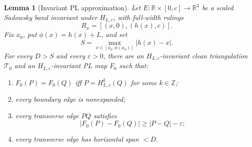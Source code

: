 \documentclass[12pt]{article}
\newcommand{\R}{\mathbb R}
\newcommand{\Z}{\mathbb Z}
\theoremstyle{plain}
\newtheorem{lemma}[theorem]{Lemma}
\begin{document}
\begin{lemma}[Invariant PL approximation]\label{lem:PL}
Let \(E:\R\times[0,c]\to\R^3\) be a scaled Sadowsky band invariant under
\(H_{L,c}\), with full-width rulings
\[
R_x=[(x,0),(h(x),c)].
\]
Fix \(x_0\), put \(\phi(x)=h(x)+L\), and set
\[
S=\max_{x\in[x_0,\phi(x_0)]}|h(x)-x|.
\]
For every \(D>S\) and every \(\varepsilon>0\), there are an
\(H_{L,c}\)-invariant clean triangulation \(\mathcal T_0\) and an
\(H_{L,c}\)-invariant PL map \(F_0\) such that:
\begin{enumerate}
\item \(F_0(P)=F_0(Q)\) iff \(P=H_{L,c}^k(Q)\) for some \(k\in\Z\);
\item every boundary edge is nonexpanded;
\item every transverse edge \(PQ\) satisfies
\[
|F_0(P)-F_0(Q)|\ge |P-Q|-\varepsilon;
\]
\item every transverse edge has horizontal span \(<D\).
\end{enumerate}
\end{lemma}
\end{document}
